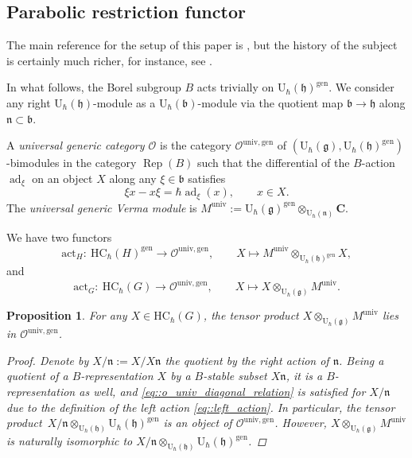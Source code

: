\documentclass[10pt,a4paper]{article}
\numberwithin{equation}{section}
\newtheorem{Proposition}[Theorem]{Proposition}
{ \theoremstyle{definition}
	\newtheorem{Definition}[Theorem]{Definition}
	\newtheorem{Note}[Theorem]{Note}
	\newtheorem{Example}[Theorem]{Example}
	\newtheorem{Remark}[Theorem]{Remark} }
\newcommand{\cO}{\mathcal{O}}
\newcommand{\C}{\mathbf{C}}
\newcommand{\U}{\mathrm{U}_{\hbar}}
\renewcommand{\b}{\mathfrak{b}}
\newcommand{\g}{\mathfrak{g}}
\newcommand{\h}{\mathfrak{h}}
\newcommand{\n}{\mathfrak{n}}
\newcommand{\act}{\mathrm{act}}
\DeclareMathOperator{\ad}{ad}
\newcommand{\gen}{\mathrm{gen}}
\newcommand{\HC}{\mathrm{HC}_{\hbar}}
\DeclareMathOperator{\Rep}{Rep}
\newcommand{\univ}{\mathrm{univ}}
\begin{document}
	\subsection{Parabolic restriction functor}
	\label{subsect::parabolic_reduction}
	
	The main reference for the setup of this paper is \cite{KalmykovSafronov}, but the history of the subject is certainly much richer, for instance, see \cite{EtingofSchiffmann}.
	
	In what follows, the Borel subgroup $B$ acts trivially on $\U(\h)^{\gen}$. We consider any right $\U(\h)$-module as a $\U(\b)$-module via the quotient map $\b \rightarrow \h$ along $\n\subset \b$.
	\begin{Definition}
		A \emph{universal generic category $\cO$} is the category $\cO^{\univ,\gen}$ of $(\U(\g),\U(\h)^{\gen})$-bimodules in the category $\Rep(B)$ such that the differential of the $B$-action $\ad_{\xi}$ on an object $X$ along any $\xi\in \b$ satisfies
		\begin{equation}
			\label{eq::o_univ_diagonal_relation}
			\xi x - x\xi = \hbar \ad_{\xi}(x),\qquad x\in X.
		\end{equation}
		The \emph{universal generic Verma module} is
$
		M^{\univ} := \U(\g)^{\gen} \otimes_{\U(\n)} \C$.
	\end{Definition}
	
	We have two functors
	\begin{equation}
		\label{eq::act_h}
		\act_H \colon \ \HC(H)^{\gen} \rightarrow \cO^{\univ,\gen},\qquad X \mapsto M^{\univ} \otimes_{\U(\h)^{\gen}} X,
	\end{equation}
	and
	\begin{equation}
		\label{eq::act_g}
		\act_G \colon \ \HC(G) \rightarrow \cO^{\univ,\gen}, \qquad X \mapsto X \otimes_{\U(\g)} M^{\univ}.
	\end{equation}
	
	\begin{Proposition}
		For any $X\in \HC(G)$, the tensor product $X \otimes_{\U(\g)} M^{\univ}$ lies in $\cO^{\univ,\gen}$.
		\begin{proof}
			Denote by $X/\n:=X/X\n$ the quotient by the right action of $\n$. Being a quotient of a $B$-representation $X$ by a $B$-stable subset $X\n$, it is a $B$-representation as well, and \eqref{eq::o_univ_diagonal_relation} is satisfied for $X/\n$ due to the definition of the left action \eqref{eq::left_action}. In particular, the tensor product~${X/\n \otimes_{\U(\h)} \U(\h)^{\gen}}$ is an object of $\cO^{\univ,\gen}$. However, $X \otimes_{\U(\g)} M^{\univ}$ is naturally isomorphic to $X/\n \otimes_{\U(\h)} \U(\h)^{\gen} $.
		\end{proof}
	\end{Proposition}
	
\end{document}
